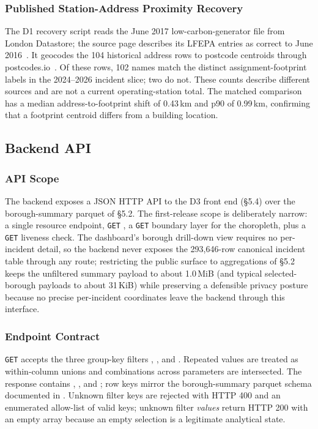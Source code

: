 \subsubsection{Published Station-Address Proximity Recovery}
The D1 recovery script reads the June 2017 low-carbon-generator file from London Datastore; the source page describes its LFEPA entries as correct to June 2016~\cite{lfb_stations}. It geocodes the 104 historical address rows to postcode centroids through postcodes.io~\cite{postcodesio}. Of these rows, 102 names match the distinct assignment-footprint labels in the 2024--2026 incident slice; two do not. These counts describe different sources and are not a current operating-station total. The matched comparison has a median address-to-footprint shift of 0.43\,km and p90 of 0.99\,km, confirming that a footprint centroid differs from a building location.

\subsection{Backend API}

\subsubsection{API Scope}
The backend exposes a JSON HTTP API to the D3 front end (\S5.4) over the borough-summary parquet of \S5.2. The first-release scope is deliberately narrow: a single resource endpoint, \texttt{GET} , a \texttt{GET}  boundary layer for the choropleth, plus a \texttt{GET}  liveness check. The dashboard's borough drill-down view requires no per-incident detail, so the backend never exposes the 293{,}646-row canonical incident table through any route; restricting the public surface to aggregations of \S5.2 keeps the unfiltered summary payload to about 1.0\,MiB (and typical selected-borough payloads to about 31\,KiB) while preserving a defensible privacy posture because no precise per-incident coordinates leave the backend through this interface.

\subsubsection{Endpoint Contract}
\texttt{GET}  accepts the three group-key filters , , and . Repeated values are treated as within-column unions and combinations across parameters are intersected. The response contains , , and ; row keys mirror the borough-summary parquet schema documented in . Unknown filter keys are rejected with HTTP 400 and an enumerated allow-list of valid keys; unknown filter \emph{values} return HTTP 200 with an empty  array because an empty selection is a legitimate analytical state.

